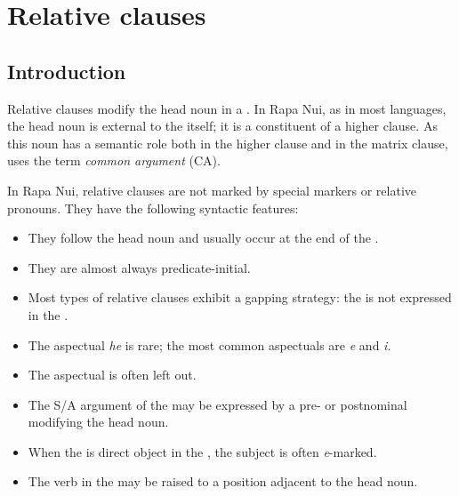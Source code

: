 \section{Relative clauses}\label{sec:11.4}
\subsection{Introduction}\label{sec:11.4.1}

Relative clauses modify the head noun in a . In Rapa Nui, as in most languages, the head noun is external to the  itself; it is a constituent of a higher clause. As this noun has a semantic role both in the higher clause and in the matrix clause, \citet[317]{Dixon2010-2} uses the term \textit{common argument} (CA).

In Rapa Nui, relative clauses are not marked by special markers or relative pronouns. They have the following syntactic features:

\begin{itemize}
\item 
They follow the head noun and usually occur at the end of the .

\item 
They are almost always predicate-initial.

\item 
Most types of relative clauses exhibit a gapping strategy: the  is not expressed in the .

\item 
The aspectual \textit{he} is rare; the most common aspectuals are \textit{e} and \textit{i}.

\item 
The aspectual is often left out.

\item 
The S/A argument of the  may be expressed by a pre- or postnominal  modifying the head noun.

\item 
When the  is direct object in the , the subject is often \textit{e}{}-marked.

\item 
The verb in the  may be raised to a position adjacent to the head noun.

\end{itemize}

